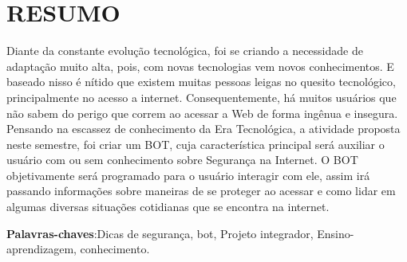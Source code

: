 \noindent\chapter*{\uppercase{Resumo}}

Diante da constante evolução tecnológica, foi se criando a necessidade de adaptação muito alta, pois, com novas tecnologias vem novos conhecimentos. E baseado nisso é nítido que existem muitas pessoas leigas no quesito tecnológico, principalmente no acesso a internet. Consequentemente, há muitos usuários que não sabem do perigo que correm ao acessar a Web de forma ingênua e insegura. \\

Pensando na escassez de conhecimento da Era Tecnológica, a atividade proposta neste semestre, foi criar um BOT, cuja característica principal será auxiliar o usuário com ou sem conhecimento sobre Segurança na Internet. O BOT objetivamente será programado para o usuário interagir com ele, assim irá passando informações sobre maneiras de se proteger ao acessar e como lidar em algumas diversas situações cotidianas que se encontra na internet.
 
\vspace{1cm}

\noindent \textbf{Palavras-chaves}:Dicas de segurança, bot, Projeto integrador, Ensino-aprendizagem, conhecimento.